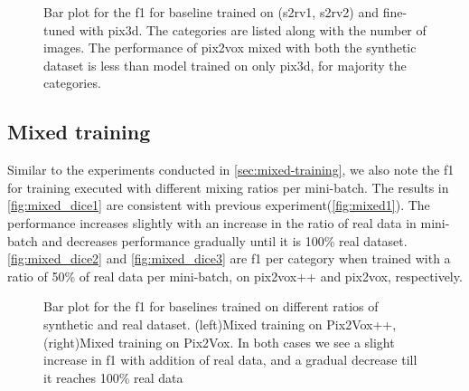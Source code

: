 \begin{figure}
    \centering
    \resizebox{0.75\textwidth}{!}{}
    \caption{Bar plot for the \gls{f1} for baseline  trained on (\gls{s2rv1}, \gls{s2rv2}) and fine-tuned with pix3d.
    The categories are listed along with the number of images.
    The performance of pix2vox mixed with both the synthetic dataset is less than model trained on only pix3d, for majority the categories.}
    \label{fig:finetuning_dice3}
\end{figure}

\subsection{Mixed training}\label{subsec:mixed-training-dice}

Similar to the experiments conducted in \autoref{sec:mixed-training}, we also note the \gls{f1} for training executed with different mixing ratios per mini-batch.
The results in \autoref{fig:mixed_dice1} are consistent with previous experiment(\autoref{fig:mixed1}).
The performance increases slightly with an increase in the ratio of real data in mini-batch and decreases performance gradually until it is 100\% real dataset.
\autoref{fig:mixed_dice2} and \autoref{fig:mixed_dice3} are \gls{f1} per category when trained with a ratio of 50\% of real data per mini-batch, on pix2vox++ and pix2vox, respectively.

\begin{figure}
    \centering
    \resizebox{0.49\linewidth}{0.45\linewidth}{}
    \resizebox{0.49\linewidth}{0.45\linewidth}{}
    \caption{Bar plot for the \gls{f1}  for baselines trained on different ratios of synthetic and real dataset.
        (left)Mixed training on Pix2Vox++, (right)Mixed training on Pix2Vox. In both cases we see a slight increase in \gls{f1} with addition of real data, and a gradual decrease till it reaches 100\% real data}
    \label{fig:mixed_dice1}
\end{figure}

